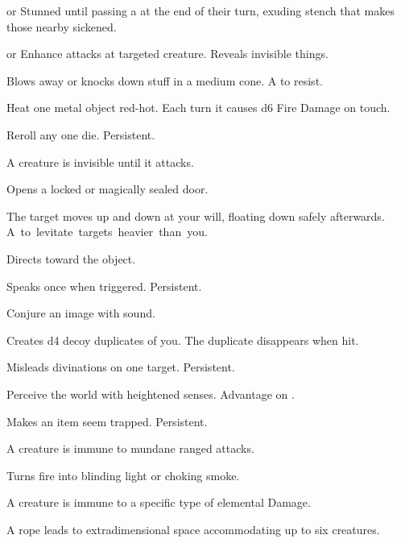 \documentclass[itdr]{subfiles}
\begin{document}
\begin{enumerate}
	\item {}  or Stunned until passing a   at the end of their turn, exuding stench that makes those nearby sickened.
	\item {}  or Enhance attacks at targeted creature. Reveals invisible things.
	\item {} Blows away or knocks down stuff in a medium cone. A  to resist.
	\item {} Heat one metal object red-hot. Each turn it causes d6 Fire Damage on touch.
	\item {} Reroll any one die. Persistent.
	\begin{minipage}{\columnwidth}
	\item {} A creature is invisible until it attacks.
	\item {} Opens a locked or magically sealed door.
	\end{minipage}
	\break
	\item {} The target moves up and down at your will, floating down safely afterwards. \mbox{A  to levitate targets heavier than you.}
	\item {} Directs toward the object.
	\item {} Speaks once when triggered. Persistent.
	\item {} Conjure an image with sound.
	\item {} Creates d4 decoy duplicates of you. The duplicate disappears when hit.
	\item {} Misleads divinations on one \mbox{target}. Persistent.
	\item {} Perceive the world with heightened senses. Advantage on .
	\item {} Makes an item seem trapped. Persistent.
	\item {} A creature is immune to mundane ranged attacks.
	\item {} Turns fire into blinding light or choking smoke.
	\item {} A creature is immune to a specific type of elemental Damage.
	\item {} A rope leads to extradimensional space accommodating up to six creatures.

\end{enumerate}
\end{document}
